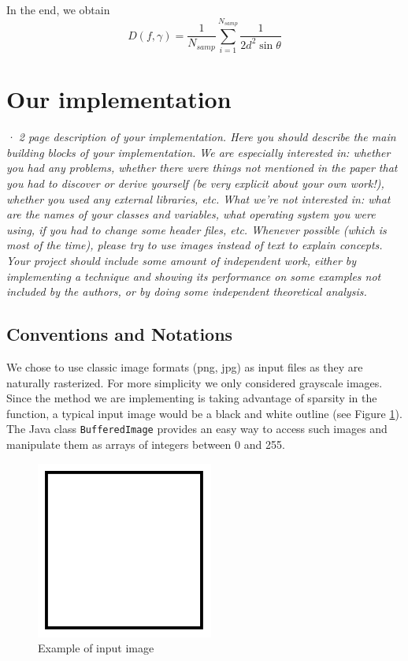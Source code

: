 \documentclass[10pt,a4paper]{article}			%
\begin{document}
In the end, we obtain $$D(f,\gamma) = \frac{1}{N_{samp}} \sum_{i=1}^{N_{samp}}\frac{1}{2d^2\sin\theta}$$


	
	\section{Our implementation}
	
	\textit{· 2 page description of your implementation. Here you should describe the main building blocks of your implementation. We are especially interested in: whether you had any problems, whether there were things not mentioned in the paper that you had to discover or derive yourself (be very explicit about your own work!), whether you used any external libraries, etc. What we're not interested in: what are the names of your classes and variables, what operating system you were using, if you had to change some header files, etc. Whenever possible (which is most of the time), please try to use images instead of text to explain concepts.\\
	Your project should include some amount of independent work, either by implementing a technique and showing its performance on some examples not included by the authors, or by doing some independent theoretical analysis.\\}

	\subsection {Conventions and Notations}
We chose to use classic image formats (png, jpg) as input files as they are naturally rasterized. For more simplicity we only considered grayscale images. Since the method we are implementing is taking advantage of sparsity in the function, a typical input image would be a black and white outline (see Figure \ref{exemple_carre}). The Java class \texttt{BufferedImage} provides an easy way to access such images and manipulate them as arrays of integers between 0 and 255. 
\begin{figure}[h]
\begin{center}
\includegraphics[scale=0.5]{img/carre.png}
\caption{Example of input image}
\label{exemple_carre}
\end{center}
\end{figure}
\end{document}
